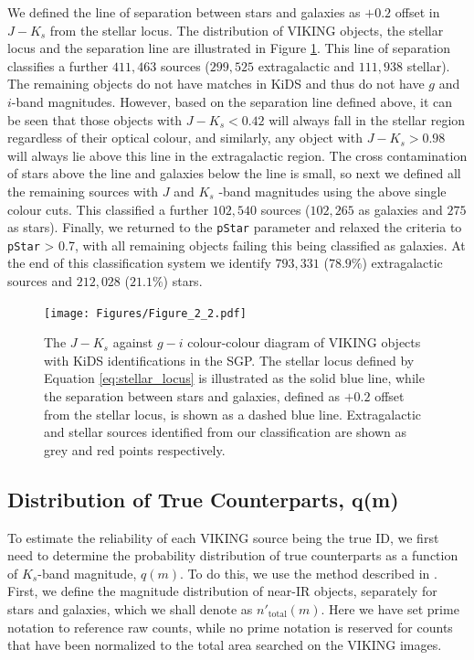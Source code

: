 We defined the line of separation between stars and galaxies as $+0.2$ offset in $J - K_s$ from the stellar locus. The distribution of VIKING objects, the stellar locus and the separation line are illustrated in Figure \ref{fig:star_galaxy_classification}. This line of separation classifies a further $411,463$ sources ($299,525$ extragalactic and $111,938$ stellar). The remaining objects do not have matches in KiDS and thus do not have $g$ and $i$-band magnitudes. However, based on the separation line defined above, it can be seen that those objects with $J - K_s < 0.42$ will always fall in the stellar region regardless of their optical colour, and similarly, any object with  $J - K_s > 0.98$ will always lie above this line in the extragalactic region. The cross contamination of stars above the line and galaxies below the line is small, so next we defined all the remaining sources with $J$ and $K_s$ -band magnitudes using the above single colour cuts. This classified a further $102,540$ sources ($102,265$ as galaxies and $275$ as stars). Finally, we returned to the \texttt{pStar} parameter and relaxed the criteria to \texttt{pStar} > 0.7, with all remaining objects failing this being classified as galaxies. At the end of this classification system we identify $793,331$ ($78.9\%$) extragalactic sources and $212,028$ ($21.1\%$) stars.

\begin{figure}
    \centering
	\texttt{[image: Figures/Figure\_2\_2.pdf]}
	\caption[$J - K_s$ against $g-i$ colour-colour plot for VIKING objects in the SGP]{The $J - K_s$ against $g-i$ colour-colour diagram of VIKING objects with KiDS identifications in the SGP. The stellar locus defined by Equation \ref{eq:stellar_locus} is illustrated as the solid blue line, while the separation between stars and galaxies, defined as $+0.2$ offset from the stellar locus, is shown as a dashed blue line. Extragalactic and stellar sources identified from our classification are shown as grey and red points respectively.}
	\label{fig:star_galaxy_classification}
\end{figure}

\subsection{Distribution of True Counterparts, q(m)}
\label{sec:true_counterparts_distribution}

To estimate the reliability of each VIKING source being the true ID, we first need to determine the probability distribution of true counterparts as a function of $K_s$-band magnitude, $q(m)$. To do this, we use the method described in \citealt{Ciliegi_2003}. First, we define the magnitude distribution of near-IR objects, separately for stars and galaxies, which we shall denote as $n'_{\textrm{total}}(m)$. Here we have set prime notation to reference raw counts, while no prime notation is reserved for counts that have been normalized to the total area searched on the VIKING images. 

